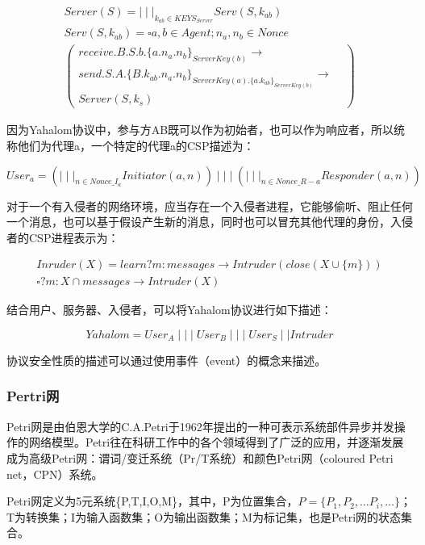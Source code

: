 \documentclass[cs4size,a4pape,UTF8]{ctexart}
\numberwithin{equation}{section}
\numberwithin{table}{section}
\numberwithin{figure}{section}
\begin{document}
\begin{multline}
Server(S)={\mid\mid\mid}_{k_{ab}\in{KEYS_{Server}}}Serv(S,k_{ab}) \\
Serv(S,k_{ab})=\square{a},b\in{Agent};n_{a},n_{b}\in{Nonce}\\
\left(
\begin{array}{lr}
	{receive.B.S.b.\{a.n_{a}.n_{b}\}_{ServerKey(b)}}\rightarrow& \\
	{send.S.A.\{B.k_{ab}.n_{a}.n_{b}\}_{ServerKey(a).\{a.k_{ab}\}_{ServerKey(b)}}}\rightarrow& \\
	{Server(S,k_{s})}&
\end{array}
\right)
\end{multline}

因为Yahalom协议中，参与方AB既可以作为初始者，也可以作为响应者，所以统称他们为代理a，一个特定的代理a的CSP描述为：

\begin{equation}
User_{a}=({\mid\mid\mid}_{n\in{Nonce\_I_{a}}}Initiator(a,n))\mid\mid\mid({\mid\mid\mid}_{n\in{Nonce\_R-{a}}}Responder(a,n))
\end{equation}

对于一个有入侵者的网络环境，应当存在一个入侵者进程，它能够偷听、阻止任何一个消息，也可以基于假设产生新的消息，同时也可以冒充其他代理的身份，入侵者的CSP进程表示为：

\begin{multline}
Inruder(X)=learn?m:messages\rightarrow{Intruder(close(X\cup{\{m\}}))}\\
\square{?}m:X\cap{messages}\rightarrow{Intruder(X)}
\end{multline}

结合用户、服务器、入侵者，可以将Yahalom协议进行如下描述：

\begin{equation}
Yahalom=User_{A}\mid\mid\mid{User_{B}}\mid\mid\mid{User_{S}}\mid\mid{Intruder}
\end{equation}

协议安全性质的描述可以通过使用事件（event）的概念来描述。

\subsubsection{Pertri网}
Petri网是由伯恩大学的C.A.Petri于1962年提出的一种可表示系统部件异步并发操作的网络模型。Petri往在科研工作中的各个领域得到了广泛的应用，并逐渐发展成为高级Petri网：谓词/变迁系统（Pr/T系统）和颜色Petri网（coloured Petri net，CPN）系统。

Petri网定义为5元系统\{P,T,I,O,M\}，其中，P为位置集合，$P=\{P_{1},P_{2},\ldots{P_{i}},\ldots{\}}$；T为转换集；I为输入函数集；O为输出函数集；M为标记集，也是Petri网的状态集合。
\end{document}
